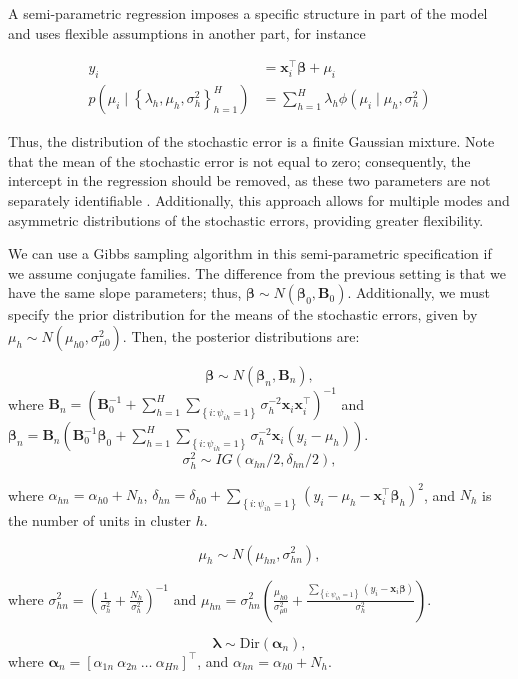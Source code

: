 A semi-parametric regression imposes a specific structure in part of the model and uses flexible assumptions in another part, for instance

\begin{align*}
	y_i&=\bm{x}_i^{\top}\bm{\beta}+\mu_i\\
	p(\mu_i \mid \left\{\lambda_h,\mu_h,\sigma_h^2\right\}_{h=1}^H)&=\sum_{h=1}^H\lambda_h\phi(\mu_i\mid \mu_h,\sigma_h^2) 
\end{align*}

Thus, the distribution of the stochastic error is a finite Gaussian mixture. Note that the mean of the stochastic error is not equal to zero; consequently, the intercept in the regression should be removed, as these two parameters are not separately identifiable \cite{van2011bayesian}. Additionally, this approach allows for multiple modes and asymmetric distributions of the stochastic errors, providing greater flexibility.

We can use a Gibbs sampling algorithm in this semi-parametric specification if we assume conjugate families. The difference from the previous setting is that we have the same slope parameters; thus, $\bm{\beta} \sim N(\bm{\beta}_{0},\bm{B}_{0})$. Additionally, we must specify the prior distribution for the means of the stochastic errors, given by $\mu_h \sim N(\mu_{h0},\sigma^2_{\mu 0})$. Then, the posterior distributions are:

$$\bm{\beta}\sim N(\bm{\beta}_{n},\bm{B}_{n}),$$ where $\bm{B}_{n}=(\bm{B}_{0}^{-1}+\sum_{h=1}^H\sum_{\left\{i:  \psi_{ih}=1\right\}}\sigma_h^{-2}\bm{x}_i\bm{x}_i^{\top})^{-1}$ and $\bm{\beta}_{n}=\bm{B}_{n}(\bm{B}_{0}^{-1}\bm{\beta}_{0}+\sum_{h=1}^H\sum_{\left\{i:  \psi_{ih}=1\right\}}\sigma_h^{-2}\bm{x}_i(y_i-\mu_h))$.
$$\sigma_h^2\sim IG(\alpha_{hn}/2,\delta_{hn}/2),$$

where $\alpha_{hn}=\alpha_{h0}+N_h$, $\delta_{hn}=\delta_{h0}+\sum_{\left\{i:  \psi_{ih}=1\right\}}(y_i-\mu_h-\bm{x}_i^{\top}\bm{\beta}_h)^2$, and $N_h$ is the number of units in cluster $h$.

$$\mu_h\sim N(\mu_{hn},\sigma_{hn}^2),$$

where $\sigma_{hn}^2=\left(\frac{1}{\sigma_{h}^{2}}+\frac{N_h}{\sigma_{h}^2}\right)^{-1}$ and $\mu_{hn}=\sigma_{hn}^2\left(\frac{\mu_{h0}}{\sigma_{\mu0}^2}+\frac{\sum_{\left\{i:\psi_{ih}=1\right\}} (y_i-\bm{x}_i\bm{\beta})}{\sigma_h^2}\right)$.

$$\bm{\lambda}\sim \text{Dir}(\bm{\alpha}_n),$$   
where $\bm{\alpha}_n=[\alpha_{1n} \  \alpha_{2n} \ \dots \ \alpha_{Hn}]^{\top}$, and $\alpha_{hn}=\alpha_{h0}+N_h$.

